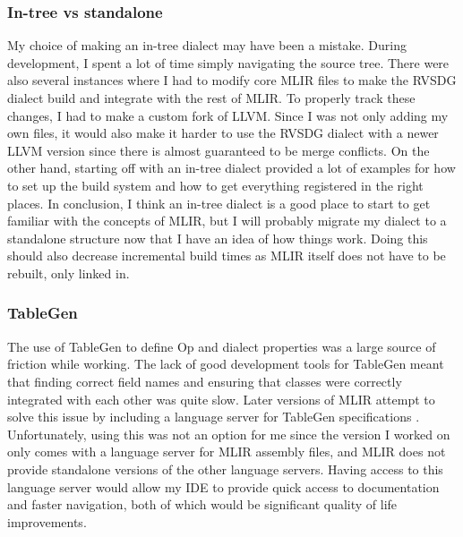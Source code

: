 \subsubsection{In-tree vs standalone} \label{sec:learnings:in-tree-vs-standalone}
My choice of making an in-tree dialect may have been a mistake. During development, I spent a lot of time simply navigating the source tree. There were also several instances where I had to modify core MLIR files to make the RVSDG dialect build and integrate with the rest of MLIR. To properly track these changes, I had to make a custom fork of LLVM. Since I was not only adding my own files, it would also make it harder to use the RVSDG dialect with a newer LLVM version since there is almost guaranteed to be merge conflicts. On the other hand, starting off with an in-tree dialect provided a lot of examples for how to set up the build system and how to get everything registered in the right places. In conclusion, I think an in-tree dialect is a good place to start to get familiar with the concepts of MLIR, but I will probably migrate my dialect to a standalone structure now that I have an idea of how things work. Doing this should also decrease incremental build times as MLIR itself does not have to be rebuilt, only linked in.

\subsubsection{TableGen}
The use of TableGen to define Op and dialect properties was a large source of friction while working. The lack of good development tools for TableGen meant that finding correct field names and ensuring that classes were correctly integrated with each other was quite slow. Later versions of MLIR attempt to solve this issue by including a language server for TableGen specifications \cite{mlir_language_server}. Unfortunately, using this was not an option for me since the version I worked on only comes with a language server for MLIR assembly files, and MLIR does not provide standalone versions of the other language servers. Having access to this language server would allow my IDE to provide quick access to documentation and faster navigation, both of which would be significant quality of life improvements. 

